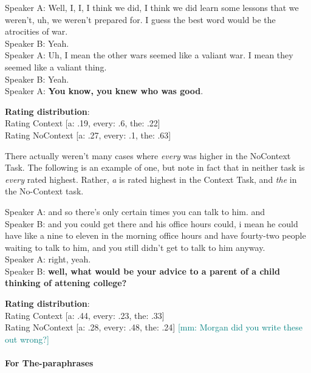 \documentclass[12pt,letterpaper,table,svgnames,dvipsnames]{article}
\newcommand{\mm}[1]{\textcolor{teal}{[mm: #1]}}
\begin{document}
\begin{exe}
\ex {}
    \begin{xlist}
    \ex {}
    Speaker A: Well, I, I, I think we did, I think we did learn some lessons that we weren't, uh, we weren't prepared for. I guess the best word would be the atrocities of war.\\
    Speaker B: Yeah.\\
    Speaker A: Uh, I mean the other wars seemed like a valiant war. I mean they seemed like a valiant thing.\\
    Speaker B: Yeah.\\
    Speaker A: \textbf{You know, you knew who was good}.
    
    \ex \textbf{Rating distribution}:\\
    Rating Context [a: .19, every: .6, the: .22]\\
    Rating NoContext [a: .27, every: .1, the: .63]
    \end{xlist}
\end{exe}


There actually weren't many cases where \emph{every} was higher in the NoContext Task. The following is an example of one, but note in fact that in neither task is \emph{every} rated highest. Rather, \emph{a} is rated highest in the Context Task, and \emph{the} in the No-Context task.
\begin{exe}
\ex {}
    \begin{xlist}
    \ex {}
    Speaker A: and so there's only certain times you can talk to him. and\\
    Speaker B: and you could get there and his office hours could, i mean he could have like a nine to eleven in the morning office hours and have fourty-two people waiting to talk to him, and you still didn't get to talk to him anyway.\\
    Speaker A: right, yeah.\\
    Speaker B: \textbf{well, what would be your advice to a parent of a child thinking of attening college?}
    
    \ex \textbf{Rating distribution}:\\
    Rating Context [a: .44, every: .23, the: .33]\\
    Rating NoContext [a: .28, every: .48, the: .24] \mm{Morgan did you write these out wrong?}
    \end{xlist}
\end{exe}




\paragraph{For The-paraphrases}
\end{document}
